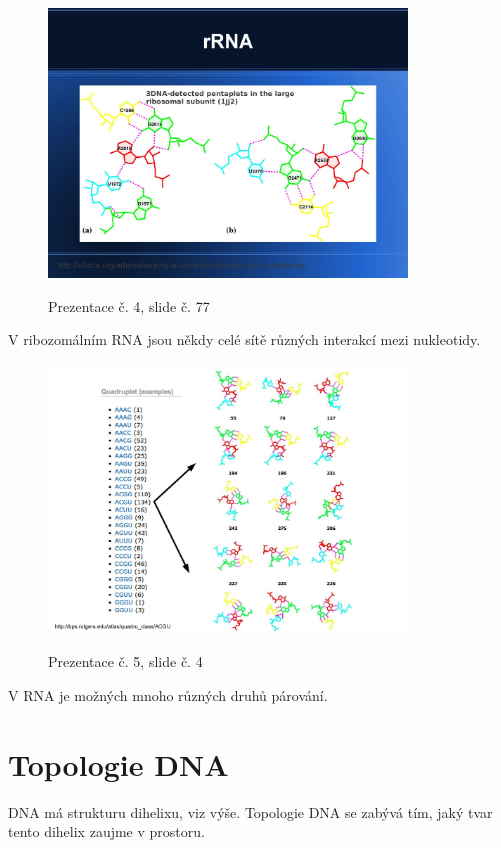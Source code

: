 \documentclass[DIV=8]{scrreprt}
\begin{document}
\begin{figure}
    \caption{Prezentace č. 4, slide č. 77}
    \includegraphics[width=0.85\textwidth]{slides-4/slide-77.jpg}
    \centering
    \label{slides-4-slide-77}
\end{figure}
 V ribozomálním RNA jsou někdy celé sítě různých interakcí mezi nukleotidy.

\begin{figure}
    \caption{Prezentace č. 5, slide č. 4}
    \includegraphics[width=0.85\textwidth]{slides-5/slide-4.jpg}
    \centering
    \label{slides-5-slide-4}
\end{figure}
 V RNA je možných mnoho různých druhů párování.

\section{Topologie DNA} \label{Topologie DNA}


DNA má strukturu dihelixu, viz výše. Topologie DNA se zabývá tím, jaký tvar tento dihelix zaujme v prostoru.
\end{document}
